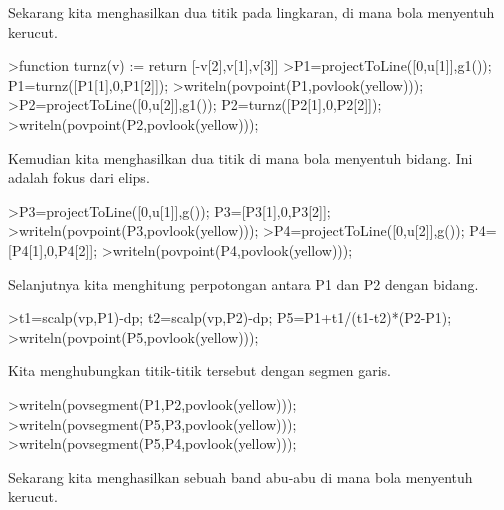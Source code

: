 \documentclass[12pt,arial,letterpaper]{book}
\begin{document}
\begin{eulercomment}
\begin{eulercomment}
\begin{eulercomment}
\begin{eulercomment}
\begin{eulercomment}
\begin{eulercomment}
\begin{eulercomment}
\begin{eulercomment}
\begin{eulercomment}
\begin{eulercomment}
\begin{eulercomment}
\begin{eulercomment}
\begin{eulercomment}
\begin{eulercomment}
\begin{eulercomment}
\begin{eulercomment}
\begin{eulercomment}
\begin{eulercomment}
\begin{eulercomment}
\begin{eulercomment}
\begin{eulercomment}
\begin{eulercomment}
\begin{eulercomment}
\begin{eulercomment}
\begin{eulercomment}
\begin{eulercomment}
\begin{eulercomment}
\begin{eulercomment}
\begin{eulercomment}
\begin{eulercomment}
\begin{eulercomment}
Sekarang kita menghasilkan dua titik pada lingkaran, di mana bola
menyentuh kerucut.
\end{eulercomment}
\begin{eulerprompt}
>function turnz(v) := return [-v[2],v[1],v[3]]
>P1=projectToLine([0,u[1]],g1()); P1=turnz([P1[1],0,P1[2]]);
>writeln(povpoint(P1,povlook(yellow)));
>P2=projectToLine([0,u[2]],g1()); P2=turnz([P2[1],0,P2[2]]);
>writeln(povpoint(P2,povlook(yellow)));
\end{eulerprompt}
\begin{eulercomment}
Kemudian kita menghasilkan dua titik di mana bola menyentuh bidang.
Ini adalah fokus dari elips.
\end{eulercomment}
\begin{eulerprompt}
>P3=projectToLine([0,u[1]],g()); P3=[P3[1],0,P3[2]];
>writeln(povpoint(P3,povlook(yellow)));
>P4=projectToLine([0,u[2]],g()); P4=[P4[1],0,P4[2]];
>writeln(povpoint(P4,povlook(yellow)));
\end{eulerprompt}
\begin{eulercomment}
Selanjutnya kita menghitung perpotongan antara P1 dan P2 dengan
bidang.
\end{eulercomment}
\begin{eulerprompt}
>t1=scalp(vp,P1)-dp; t2=scalp(vp,P2)-dp; P5=P1+t1/(t1-t2)*(P2-P1);
>writeln(povpoint(P5,povlook(yellow)));
\end{eulerprompt}
\begin{eulercomment}
Kita menghubungkan titik-titik tersebut dengan segmen garis.
\end{eulercomment}
\begin{eulerprompt}
>writeln(povsegment(P1,P2,povlook(yellow)));
>writeln(povsegment(P5,P3,povlook(yellow)));
>writeln(povsegment(P5,P4,povlook(yellow)));
\end{eulerprompt}
\begin{eulercomment}
Sekarang kita menghasilkan sebuah band abu-abu di mana bola menyentuh
kerucut.
\end{eulercomment}
\begin{eulerprompt}

\end{eulerprompt}
\end{eulercomment}
\end{eulercomment}
\end{eulercomment}
\end{eulercomment}
\end{eulercomment}
\end{eulercomment}
\end{eulercomment}
\end{eulercomment}
\end{eulercomment}
\end{eulercomment}
\end{eulercomment}
\end{eulercomment}
\end{eulercomment}
\end{eulercomment}
\end{eulercomment}
\end{eulercomment}
\end{eulercomment}
\end{eulercomment}
\end{eulercomment}
\end{eulercomment}
\end{eulercomment}
\end{eulercomment}
\end{eulercomment}
\end{eulercomment}
\end{eulercomment}
\end{eulercomment}
\end{eulercomment}
\end{eulercomment}
\end{eulercomment}
\end{eulercomment}
\end{document}
